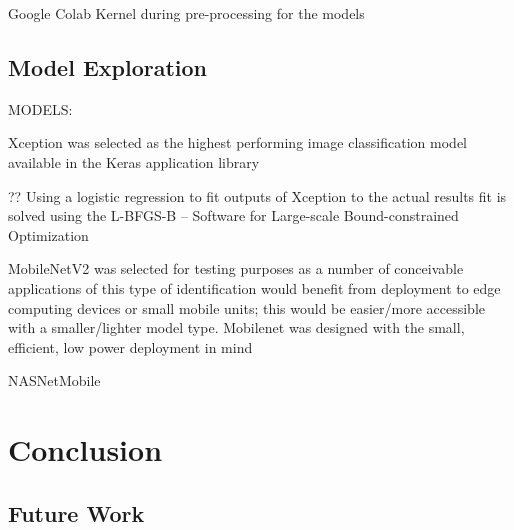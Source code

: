 \documentclass[]{article}
\begin{document}
Google Colab Kernel during pre-processing for the models

\subsection{Model Exploration}

MODELS:

Xception \cite{Chollet2016}
was selected as the highest performing image classification model available in the Keras application library

?? Using a logistic regression to fit outputs of Xception to the actual results 
fit is solved using the L-BFGS-B – Software for Large-scale Bound-constrained Optimization \cite{Zhu1997}

MobileNetV2 \cite{Howard2017} \cite{Sandler2019}
was selected for testing purposes as a number of conceivable applications of this type of identification would benefit from deployment to edge computing devices or small mobile units; this would be easier/more accessible with a smaller/lighter model type.
Mobilenet was designed with the small, efficient, low power deployment in mind 


NASNetMobile

	


	
\section{Conclusion}

\subsection{Future Work}



\clearpage


\end{document}
